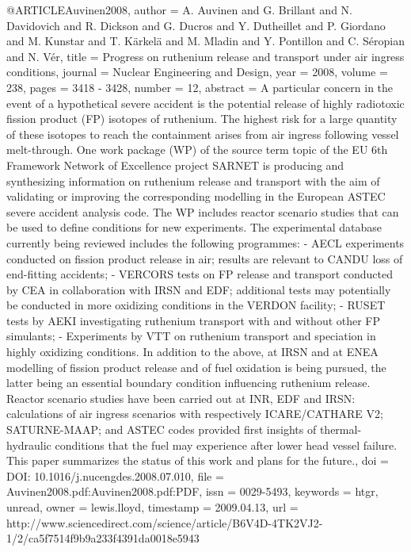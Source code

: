 @ARTICLE{Auvinen2008,
  author = {A. Auvinen and G. Brillant and N. Davidovich and R. Dickson and G.
	Ducros and Y. Dutheillet and P. Giordano and M. Kunstar and T. Kärkelä
	and M. Mladin and Y. Pontillon and C. Séropian and N. Vér},
  title = {Progress on ruthenium release and transport under air ingress conditions},
  journal = {Nuclear Engineering and Design},
  year = {2008},
  volume = {238},
  pages = {3418 - 3428},
  number = {12},
  abstract = {A particular concern in the event of a hypothetical severe accident
	is the potential release of highly radiotoxic fission product (FP)
	isotopes of ruthenium. The highest risk for a large quantity of these
	isotopes to reach the containment arises from air ingress following
	vessel melt-through. One work package (WP) of the source term topic
	of the EU 6th Framework Network of Excellence project SARNET is producing
	and synthesizing information on ruthenium release and transport with
	the aim of validating or improving the corresponding modelling in
	the European ASTEC severe accident analysis code. The WP includes
	reactor scenario studies that can be used to define conditions for
	new experiments. The experimental database currently being reviewed
	includes the following programmes: - AECL experiments conducted on
	fission product release in air; results are relevant to CANDU loss
	of end-fitting accidents; - VERCORS tests on FP release and transport
	conducted by CEA in collaboration with IRSN and EDF; additional tests
	may potentially be conducted in more oxidizing conditions in the
	VERDON facility; - RUSET tests by AEKI investigating ruthenium transport
	with and without other FP simulants; - Experiments by VTT on ruthenium
	transport and speciation in highly oxidizing conditions. In addition
	to the above, at IRSN and at ENEA modelling of fission product release
	and of fuel oxidation is being pursued, the latter being an essential
	boundary condition influencing ruthenium release. Reactor scenario
	studies have been carried out at INR, EDF and IRSN: calculations
	of air ingress scenarios with respectively ICARE/CATHARE V2; SATURNE-MAAP;
	and ASTEC codes provided first insights of thermal-hydraulic conditions
	that the fuel may experience after lower head vessel failure. This
	paper summarizes the status of this work and plans for the future.},
  doi = {DOI: 10.1016/j.nucengdes.2008.07.010},
  file = {Auvinen2008.pdf:Auvinen2008.pdf:PDF},
  issn = {0029-5493},
  keywords = {htgr, unread},
  owner = {lewis.lloyd},
  timestamp = {2009.04.13},
  url = {http://www.sciencedirect.com/science/article/B6V4D-4TK2VJ2-1/2/ca5f7514f9b9a233f4391da0018e5943}
}

